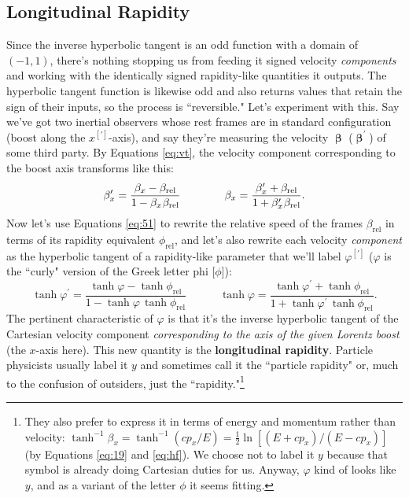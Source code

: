 \documentclass[12pt]{article}
\newcommand{\vvbeta}{\bm{\upbeta}}
\begin{document}
\subsection{Longitudinal Rapidity}\label{ssec:lr}

Since the inverse hyperbolic tangent is an odd function with a domain of $(-1, 1)$, there's nothing stopping us from feeding it signed velocity \emph{components} and working with the identically signed rapidity-like quantities it outputs. The hyperbolic tangent function is likewise odd and also returns values that retain the sign of their inputs, so the process is ``reversible." Let's experiment with this. Say we've got two inertial observers whose rest frames are in standard configuration (boost along the $x^{[\prime]}$-axis), and say they're measuring the velocity $\vvbeta$ ($\vvbeta^\prime$) of some third party. By Equations \ref{eq:vt}, the velocity component corresponding to the boost axis transforms like this:
\begin{equation*}
\beta_x^{\prime} = \frac{\beta_x - \beta_{\textrm{rel}}}{1 - \beta_{x} \mkern1mu \beta_{\textrm{rel}}} \qquad \qquad \beta_x = \frac{\beta_x^{\prime} + \beta_{\textrm{rel}}}{1 + \beta_x^{\prime} \mkern1mu \beta_{\textrm{rel}}}.
\end{equation*}
Now let's use Equations \ref{eq:51} to rewrite the relative speed of the frames $\beta_{\textrm{rel}}$ in terms of its rapidity equivalent $\phi_{\textrm{rel}}$, and let's also rewrite each velocity \emph{component} as the hyperbolic tangent of a rapidity-like parameter that we'll label $\varphi^{[\prime]}$ ($\varphi$ is the ``curly" version of the Greek letter phi [$\phi$]):
\begin{equation}\label{eq:th}
\tanh{\varphi^{\prime}} = \frac{\tanh{\varphi} - \tanh{\phi_{\textrm{rel}}}}{1 - \tanh{\varphi} \,  \tanh{\phi_{\textrm{rel}}}} \qquad \quad \tanh{\varphi} = \frac{\tanh{\varphi^{\prime}} + \tanh{\phi_{\textrm{rel}}}}{1 + \tanh{\varphi^{\prime}} \, \tanh{\phi_{\textrm{rel}}}} .
\end{equation}
The pertinent characteristic of $\varphi$ is that it's the inverse hyperbolic tangent of the Cartesian velocity component \emph{corresponding to the axis of the given Lorentz boost} (the $x$-axis here). This new quantity is the \textbf{longitudinal rapidity}. Particle physicists usually label it $y$ and sometimes call it the ``particle rapidity" or, much to the confusion of outsiders, just the ``rapidity."\footnote{They also prefer to express it in terms of energy and momentum rather than velocity: $\tanh^{-1}{\beta_x} = \tanh^{-1}{(cp_x / E)} = \frac{1}{2} \ln{[(E + cp_x) / (E - cp_x) ]}$ (by Equations \ref{eq:19} and \ref{eq:hf}). We choose not to label it $y$ because that symbol is already doing Cartesian duties for us. Anyway, $\varphi$ kind of looks like $y$, and as a variant of the letter $\phi$ it seems fitting.}
\end{document}
